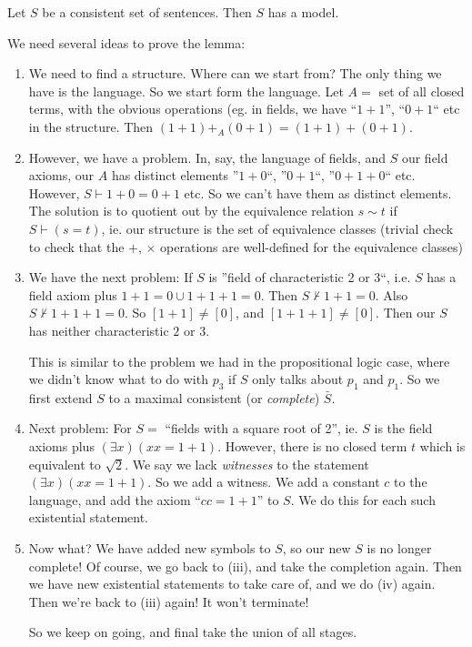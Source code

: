 \documentclass[a4paper]{article}
\begin{document}
\begin{thm}
  Let $S$ be a consistent set of sentences. Then $S$ has a model.
\end{thm}

We need several ideas to prove the lemma:
\begin{enumerate}
  \item We need to find a structure. Where can we start from? The only thing we have is the language. So we start form the language. Let $A =$ set of all closed terms, with the obvious operations (eg. in fields, we have ``$1 + 1$'', ``$0 + 1$`` etc in the structure. Then $(1 + 1) +_A (0 + 1) = (1 + 1) + (0 + 1)$.
  \item However, we have a problem. In, say, the language of fields, and $S$ our field axioms, our $A$ has distinct elements ''$1 + 0$``, ''$0 + 1$``, ''$0 + 1 + 0$`` etc. However, $S\vdash 1 + 0 = 0 + 1$ etc. So we can't have them as distinct elements. The solution is to quotient out by the equivalence relation $s\sim t$ if $S\vdash (s = t)$, ie. our structure is the set of equivalence classes (trivial check to check that the $+$, $\times$ operations are well-defined for the equivalence classes)
  \item We have the next problem: If $S$ is ''field of characteristic 2 or 3``, i.e. $S$ has a field axiom plus $1 + 1 = 0 \cup  1 + 1 + 1 = 0$. Then $S\not\vdash 1 + 1 = 0$. Also $S\not\vdash 1 + 1 + 1 = 0$. So $[1 + 1] \not = [0]$, and $[1 + 1 + 1] \not= [0]$. Then our $S$ has neither characteristic $2$ or $3$.

    This is similar to the problem we had in the propositional logic case, where we didn't know what to do with $p_3$ if $S$ only talks about $p_1$ and $p_1$. So we first extend $S$ to a maximal consistent (or \emph{complete}) $\bar S$.

  \item Next problem: For $S =$ ``fields with a square root of 2'', ie. $S$ is the field axioms plus $(\exists x)(xx = 1 + 1)$. However, there is no closed term $t$ which is equivalent to $\sqrt{2}$. We say we lack \emph{witnesses} to the statement $(\exists x)(xx = 1 + 1)$. So we add a witness. We add a constant $c$ to the language, and add the axiom ``$cc = 1 + 1$'' to $S$. We do this for each such existential statement.

  \item Now what? We have added new symbols to $S$, so our new $S$ is no longer complete! Of course, we go back to (iii), and take the completion again. Then we have new existential statements to take care of, and we do (iv) again. Then we're back to (iii) again! It won't terminate! 
      
      So we keep on going, and final take the union of all stages.
  \end{enumerate}
\end{document}
